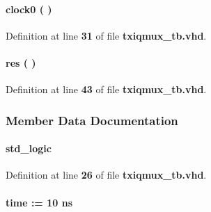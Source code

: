\paragraph[{clock0}]{\setlength{\rightskip}{0pt plus 5cm} {\bfseries \textcolor{vhdlchar}{ }} clock0 ( ) \hspace{0.3cm}{\ttfamily [Process]}}\label{classtxiqmux__tb_1_1tb__behave_a0ffcf9b3fa89917ed2b73a96f170b7ae}


Definition at line {\bf 31} of file {\bf txiqmux\+\_\+tb.\+vhd}.

\paragraph[{res}]{\setlength{\rightskip}{0pt plus 5cm} {\bfseries \textcolor{vhdlchar}{ }} res ( ) \hspace{0.3cm}{\ttfamily [Process]}}\label{classtxiqmux__tb_1_1tb__behave_ab0bd7560790c13b656fd58e17e35143e}


Definition at line {\bf 43} of file {\bf txiqmux\+\_\+tb.\+vhd}.



\subsubsection{Member Data Documentation}
\paragraph[{clk0}]{ {\bfseries \textcolor{comment}{std\+\_\+logic}\textcolor{vhdlchar}{ }} \hspace{0.3cm}{\ttfamily [Signal]}}\label{classtxiqmux__tb_1_1tb__behave_a693d72741b9413130fe2d67511b642be}


Definition at line {\bf 26} of file {\bf txiqmux\+\_\+tb.\+vhd}.

\paragraph[{clk0\+\_\+period}]{ {\bfseries \textcolor{comment}{time}\textcolor{vhdlchar}{ }\textcolor{vhdlchar}{ }\textcolor{vhdlchar}{\+:}\textcolor{vhdlchar}{=}\textcolor{vhdlchar}{ }\textcolor{vhdlchar}{ }\textcolor{vhdlchar}{ } \textcolor{vhdldigit}{10} \textcolor{vhdlchar}{ }\textcolor{vhdlchar}{ns}\textcolor{vhdlchar}{ }} \hspace{0.3cm}{\ttfamily [Constant]}}\label{classtxiqmux__tb_1_1tb__behave_ad03d90619a1930e0f5daa16a616edd90}


